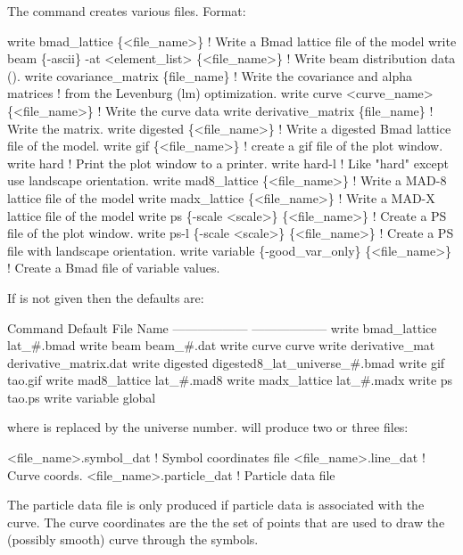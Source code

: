 {{{{The  command creates various files.
Format:
\begin{example}
  write bmad_lattice \{<file_name>\}       ! Write a Bmad lattice file of the model
  write beam \{-ascii\} -at <element_list> \{<file_name>\} 
                                         ! Write beam distribution data ().
  write covariance_matrix \{file_name\}    ! Write the covariance and alpha matrices 
                                         !   from the Levenburg (lm) optimization.
  write curve <curve_name> \{<file_name>\} ! Write the curve data
  write derivative_matrix \{file_name\}    ! Write the  matrix.
  write digested \{<file_name>\}     ! Write a digested Bmad lattice file of the model.
  write gif \{<file_name>\}          ! create a gif file of the plot window.
  write hard                       ! Print the plot window to a printer.
  write hard-l                     ! Like "hard" except use landscape orientation. 
  write mad8_lattice \{<file_name>\} ! Write a MAD-8 lattice file of the model
  write madx_lattice \{<file_name>\} ! Write a MAD-X lattice file of the model
  write ps \{-scale <scale>\} \{<file_name>\}      
                                   ! Create a PS file of the plot window.
  write ps-l \{-scale <scale>\} \{<file_name>\}    
                                   ! Create a PS file with landscape orientation.
  write variable \{-good_var_only\} \{<file_name>\} 
                                   ! Create a Bmad file of variable values.
\end{example}

\vskip 0.2in 

If  is not given then the defaults are:
\begin{example}
  Command                         Default File Name
  ------------------              ------------------
  write bmad_lattice             lat_#.bmad
  write beam                     beam_#.dat
  write curve                    curve
  write derivative_mat           derivative_matrix.dat              
  write digested                 digested8_lat_universe_#.bmad
  write gif                      tao.gif
  write mad8_lattice             lat_#.mad8
  write madx_lattice             lat_#.madx
  write ps                       tao.ps
  write variable                 global%
\end{example}
where \vn{\#} is replaced by the universe number.  will produce two or three files: 
\begin{example}
  <file_name>.symbol_dat    ! Symbol coordinates file
  <file_name>.line_dat      ! Curve coords.
  <file_name>.particle_dat  ! Particle data file
\end{example}
The particle data file is only produced if particle
data is associated with the curve.
The curve coordinates are the the set of points that are used to draw the
(possibly smooth) curve through the symbols.

}}}}
